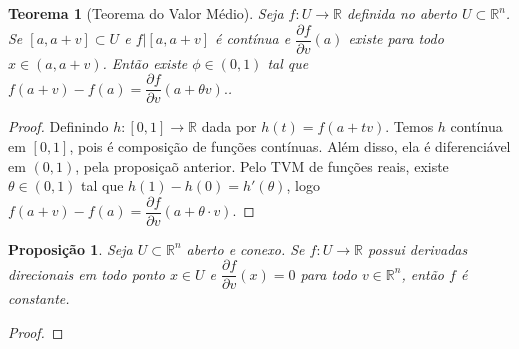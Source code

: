 \documentclass{article}
\newtheorem{prop}{Proposição}[section]
\theoremstyle{theorem}
\newtheorem{teo}{Teorema}
\theoremstyle{lemma}
\theoremstyle{definition}
\theoremstyle{remark}
\begin{document}
   \begin{teo}[Teorema do Valor Médio]
	   Seja \( f: U \to \mathbb{R}\) definida no aberto \( U \subset \mathbb{R}^n\). Se \( [a,a+v]\subset U\) e \(f|[a,a+v]\) é contínua e \( \dfrac{\partial f}{\partial v}(a)\) existe para todo \( x\in (a,a+v)\). Então existe \(\phi\in(0,1) \) tal que \( f(a+v) - f(a) = \dfrac{\partial f}{\partial v}(a+\theta v).\).
   \end{teo}
   \begin{proof}
	   Definindo \(h: [0,1] \to \mathbb{R}\) dada por \( h(t) = f(a+tv) \). Temos \(h\) contínua em \( [0,1]\), pois é composição de funções contínuas. Além disso, ela é diferenciável em \((0,1)\), pela proposiçaõ anterior. Pelo TVM de funções reais, existe \( \theta\in (0,1) \) tal que \( h(1) - h(0) = h'(\theta)\), logo \( f(a+v) - f(a) = \dfrac{\partial f}{\partial v}(a+\theta\cdot v) \).
   \end{proof}
   \begin{prop}
	   Seja \( U \subset \mathbb{R}^n \) aberto e conexo. Se \( f: U \to \mathbb{R} \) possui derivadas direcionais em todo ponto \(x\in U\) e \( \dfrac{\partial f}{\partial v} (x) = 0 \) para todo \(v\in \mathbb{R}^n \), então \(f \) é constante.
   \end{prop}
   \begin{proof}
   \end{proof}
\end{document}

